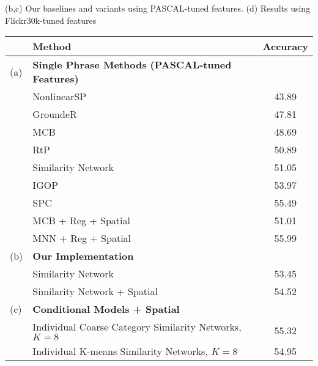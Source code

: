 \documentclass[runningheads]{llncs}
\makeatletter
\DeclareRobustCommand\onedot{\futurelet\@let@token\@onedot}
\def\@onedot{\ifx\@let@token.\else.\null\fi\xspace}
\def\etal{\emph{et al}\onedot}
\makeatother
\begin{document}
\begin{table}[t]
{(b,c) Our baselines and variants using PASCAL-tuned features. (d) Results using Flickr30k-tuned features}
\label{tab:flickr_overall}
    \begin{tabular}{|ll|c|}
      \hline
      & Method & Accuracy\\
      \hline
      \hline
      (a) & {\bf Single Phrase Methods (PASCAL-tuned Features)\footnotemark} & \\
      & NonlinearSP~\cite{wang2016CVPR} &  43.89 \\
      & GroundeR~\cite{rohrbach2015} &  47.81 \\
      & MCB~\cite{fukui16emnlp} &  48.69 \\
      & RtP~\cite{flickrentitiesijcv} &  50.89 \\
      & Similarity Network%
      ~\cite{wangTwoBranch2017} 
      &  51.05 \\
      & IGOP~\cite{yehNIPS2017} & 53.97\\
      & SPC~\cite{plummerPLCLC2017} & 55.49\\
      & MCB + Reg + Spatial~\cite{ChenICMR2017} & 51.01\\
      & MNN + Reg + Spatial~\cite{ChenICMR2017} & 55.99\\
      \hline
      (b) & {\bf Our Implementation} &\\
      & Similarity Network & 53.45 \\
      & Similarity Network + Spatial & 54.52 \\
      \hline
      (c) & {\bf Conditional Models + Spatial} &\\
      & Individual Coarse Category Similarity Networks, $K=8$ & 55.32\\
      & Individual K-means Similarity Networks, $K=8$ & 54.95\\

\end{tabular}
\end{table}
\end{document}
